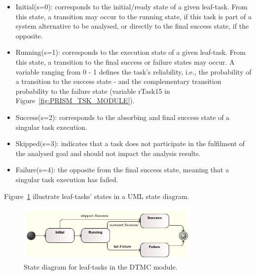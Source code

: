 \begin{itemize}

\item Initial(s=0): corresponds to the initial/ready state of a given leaf-task. From this state, a transition may occur to the running state, if this task is part of a system alternative to be analysed, or directly to the final success state, if the opposite.
\medskip

\item Running(s=1): corresponds to the execution state of a given leaf-task. From this state, a transition to the final success or failure states may occur. A variable ranging from 0 - 1 defines the task's reliability, i.e., the probability of a transition to the success state - and the complementary transition probability to the failure state (variable rTask15 in Figure~\ref{fig:PRISM_TSK_MODULE}).
\medskip

\item Success(s=2): corresponds to the absorbing and final success state of a singular task execution.
\medskip

\item Skipped(s=3): indicates that a task does not participate in the fulfilment of the analysed goal and should not impact the analysis results.
\medskip

\item Failure(s=4): the opposite from the final success state, meaning that a singular task execution has failed.

\end{itemize}

Figure~\ref{fig:UML_TSK_STATES} illustrate leaf-tasks' states in a UML state diagram.


\begin{figure}[ht!]
\centering
\includegraphics[width=0.8\textwidth]{imgs/UML_TSK_STATES.png}
\caption{State diagram for leaf-tasks in the DTMC module.}
\label{fig:UML_TSK_STATES}
\end{figure}

